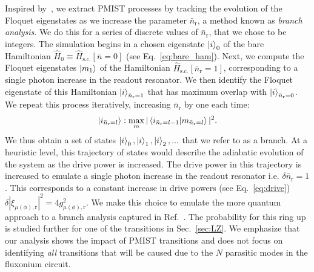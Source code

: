 \documentclass[%
reprint,
superscriptaddress,
 amsmath,amssymb,
 aps,
 prx,
longbibliography,
floatfix,
]{revtex4-2}
\begin{document}
Inspired by~\cite{dumas2024unified,cohen2023reminiscence}, we extract PMIST processes by tracking the evolution of  the Floquet eigenstates as we increase the parameter $\bar{n}_\textrm{r}$, a method known as \emph{branch analysis}. 
We do this for a series of discrete values of $\bar{n}_\textrm{r}$, that we chose to be integers.  The simulation begins in a chosen eigenstate $\ket{i}_0$ of the bare Hamiltonian $\hat{H}_0 \equiv \hat{H}_\textrm{s.c.}[\bar{n}=0]$ (see Eq.~\ref{eq:bare_ham}). 
Next, we compute the Floquet eigenstates $\ket{m_1}$ of the Hamiltonian $\hat{H}_\textrm{s.c.}[\bar{n}_\textrm{r}=1]$,
corresponding to a single photon increase in the readout resonator. We then identify the Floquet eigenstate of this Hamiltonian $\ket{i}_{\bar n_\textrm{r}=1}$ that has maximum overlap with $\ket{i}_{\bar n_\textrm{r}=0}$.  We repeat this process iteratively, increasing $\bar{n}_\textrm{r}$ by one each time:
\begin{align}
\ket{i_{\bar n_\textrm{r}=l}}:\max_{m}|\braket{i_{\bar n_\textrm{r}=l-1}|{m}_{\bar n_\textrm{r}=l}}|^2.\label{eq:track_Floquet}   
\end{align}
We thus obtain a set of states $\ket{i}_0,\ket{i}_1,\ket{i}_2,...$ that we refer to as a branch.  At a heuristic level, this trajectory of states would describe the adiabatic evolution of the system as the drive power is increased. The drive power in this trajectory is increased to emulate a single photon increase in the readout resonator i.e. $\delta \bar n_\textrm{r}=1$. This corresponds to a constant increase in drive powers (see Eq.~\ref{eq:drive}) $\delta |\xi_{\mu (\phi),\textrm{r}}|^2=4g_{\mu (\phi),\textrm{r}}^2$. We make this choice to emulate the more quantum approach to a branch analysis captured in Ref.~\cite{shillito2022dynamics,dumas2024unified}. The probability for this ring up is studied further for one of the transitions in Sec.~\ref{sec:LZ}. We emphasize that our analysis shows the impact of PMIST transitions and does not focus on identifying \emph{all} transitions that will be caused due to the $N$ parasitic modes in the fluxonium circuit.
\end{document}
